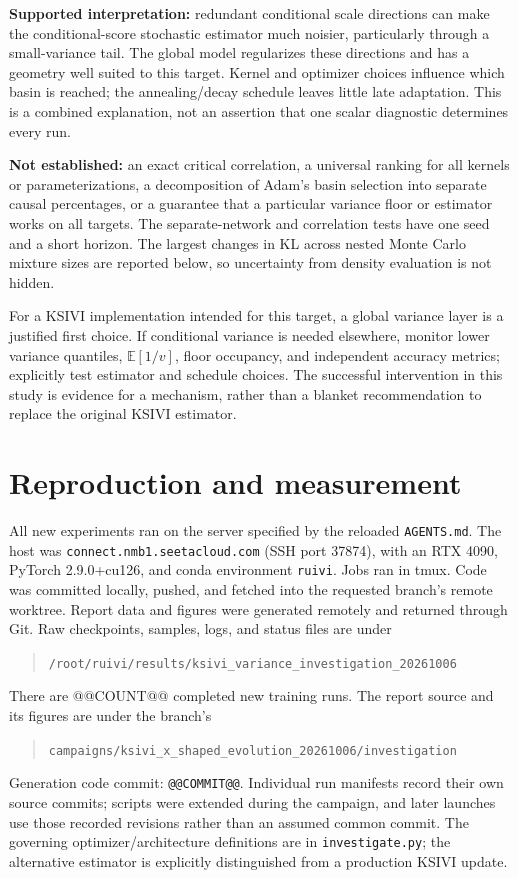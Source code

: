 \documentclass[11pt,a4paper]{article}
\numberwithin{equation}{section}
\newcommand{\E}{\mathbb E}
\begin{document}
\textbf{Supported interpretation:} redundant conditional scale directions
can make the conditional-score stochastic estimator much noisier, particularly
through a small-variance tail. The global model regularizes these directions
and has a geometry well suited to this target. Kernel and optimizer choices
influence which basin is reached; the annealing/decay schedule leaves little
late adaptation. This is a combined explanation, not an assertion that one
scalar diagnostic determines every run.

\textbf{Not established:} an exact critical correlation, a universal ranking
for all kernels or parameterizations, a decomposition of Adam's basin
selection into separate causal percentages, or a guarantee that a particular
variance floor or estimator works on all targets. The separate-network and
correlation tests have one seed and a short horizon. The largest changes in
KL across nested Monte Carlo mixture sizes are reported below, so uncertainty
from density evaluation is not hidden.

For a KSIVI implementation intended for this target, a global variance layer
is a justified first choice. If conditional variance is needed elsewhere,
monitor lower variance quantiles, $\E[1/v]$, floor occupancy, and independent
accuracy metrics; explicitly test estimator and schedule choices. The
successful intervention in this study is evidence for a mechanism, rather
than a blanket recommendation to replace the original KSIVI estimator.

\section{Reproduction and measurement}
All new experiments ran on the server specified by the reloaded
\texttt{AGENTS.md}. The host was \nolinkurl{connect.nmb1.seetacloud.com}
(SSH port 37874), with an RTX 4090, PyTorch 2.9.0+cu126, and conda
environment \texttt{ruivi}. Jobs ran in
tmux. Code was committed locally, pushed, and fetched into the requested
branch's remote worktree. Report data and figures were generated remotely
and returned through Git. Raw checkpoints, samples, logs, and status files
are under
\begin{quote}\small\nolinkurl{/root/ruivi/results/ksivi_variance_investigation_20261006}\end{quote}
There are @@COUNT@@ completed new training runs. The report source and its
figures are under the branch's
\begin{quote}\small\nolinkurl{campaigns/ksivi_x_shaped_evolution_20261006/investigation}\end{quote}
Generation code commit: {\small\texttt{@@COMMIT@@}}.
Individual run manifests record
their own source commits; scripts were extended during the campaign, and
later launches use those recorded revisions rather than an assumed common
commit. The governing optimizer/architecture definitions are in
\texttt{investigate.py}; the alternative estimator is explicitly distinguished
from a production KSIVI update.
\end{document}

